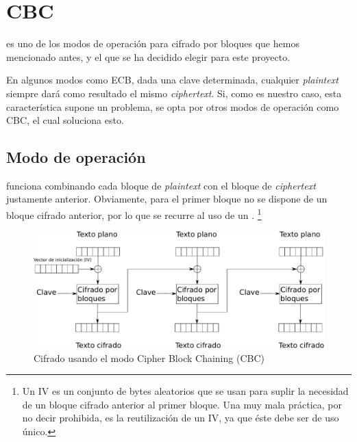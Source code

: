 
 \section{CBC}

  es uno de los modos de operación para cifrado por bloques que hemos mencionado antes,
 y el que se ha decidido elegir para este proyecto.

 En algunos modos como ECB, dada una clave determinada,
 cualquier \emph{plaintext} siempre dará como resultado el mismo \emph{ciphertext}.
 Si, como es nuestro caso, esta característica supone un problema,
 se opta por otros modos de operación como CBC, el cual soluciona esto. \emph{\parencite{Reference23}}

 \subsection{Modo de operación}

  funciona combinando cada bloque de \emph{plaintext} con el bloque de \emph{ciphertext} justamente anterior.
 Obviamente, para el primer bloque no se dispone de un bloque cifrado anterior,
 por lo que se recurre al uso de un .
 \footnote{Un IV es un conjunto de bytes aleatorios que se usan para suplir la necesidad de un bloque cifrado anterior al primer bloque.
 Una muy mala práctica, por no decir prohibida, es la reutilización de un IV, ya que éste debe ser de uso único.}

 \begin{figure}[ht]
   \centering
   \includegraphics[scale=0.5]{Figures/CBC_enc}
   \decoRule
   \caption[Cipher Block Chaining (CBC) - Cifrado]{Cifrado usando el modo Cipher Block Chaining (CBC)}
   \label{fig:CBC_enc}
 \end{figure}

